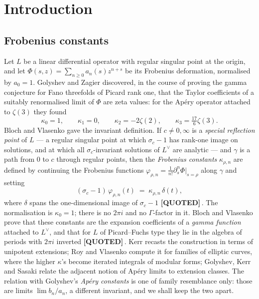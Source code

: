 \documentclass[11pt,reqno]{amsart}
\theoremstyle{plain}
\theoremstyle{definition}
\theoremstyle{remark}
\newcommand{\QUOTEDMARK}{{\normalfont\sffamily\bfseries[QUOTED]}}
\newcommand{\QUOTED}[1]{\QUOTEDMARK\,#1}
\begin{document}
\maketitle

\setcounter{tocdepth}{1}
\tableofcontents

\section{Introduction}

\subsection{Frobenius constants}
Let $L$ be a linear differential operator with regular singular point at the origin, and let
$\Phi(s,z)=\sum_{n\ge 0}a_n(s)z^{n+s}$ be its Frobenius deformation, normalised by $a_0=1$.
Golyshev and Zagier \cite{GZ1} discovered, in the course of proving the gamma conjecture for
Fano threefolds of Picard rank one, that the Taylor coefficients of a suitably renormalised
limit of $\Phi$ are zeta values: for the Ap\'ery operator attached to $\zeta(3)$ they found
\begin{equation}\label{eq:apery3}
  \kappa_0=1,\qquad \kappa_1=0,\qquad \kappa_2=-2\zeta(2),\qquad \kappa_3=\tfrac{17}{6}\zeta(3).
\end{equation}
Bloch and Vlasenko \cite{BV} gave the invariant definition. If $c\ne 0,\infty$ is a
\emph{special reflection point} of $L$ --- a regular singular point at which $\sigma_c-1$ has
rank-one image on solutions, and at which all $\sigma_c$-invariant solutions of $L^\vee$ are
analytic --- and $\gamma$ is a path from $0$ to $c$ through regular points, then the
\emph{Frobenius constants} $\kappa_{\rho,n}$ are defined by continuing the Frobenius functions
$\varphi_{\rho,n}=\tfrac{1}{n!}\partial_s^n\Phi|_{s=\rho}$ along $\gamma$ and setting
\begin{equation}\label{eq:BVdef}
  (\sigma_c-1)\,\varphi_{\rho,n}(t) \;=\; \kappa_{\rho,n}\,\delta(t),
\end{equation}
where $\delta$ spans the one-dimensional image of $\sigma_c-1$ \QUOTED{\cite[Def.~22]{BV}}. The
normalisation is $\kappa_0=1$; there is no $2\pi i$ and no $\Gamma$-factor in it. Bloch and
Vlasenko prove that these constants are the expansion coefficients of a \emph{gamma function}
attached to $L^\vee$, and that for $L$ of Picard--Fuchs type they lie in the algebra of periods
with $2\pi i$ inverted \QUOTED{\cite[Thm.~30, Cor.~31]{BV}}. Kerr \cite{Kerr} recasts the
construction in terms of unipotent extensions; Roy and Vlasenko \cite{RV} compute it for
families of elliptic curves, where the higher $\kappa$'s become iterated integrals of modular
forms; Golyshev, Kerr and Sasaki \cite{GKS} relate the adjacent notion of Ap\'ery limits to
extension classes. The relation with Golyshev's \emph{Ap\'ery constants} \cite{Gol} is one of
family resemblance only: those are limits $\lim b_n/a_n$, a different invariant, and we shall
keep the two apart.
\end{document}
